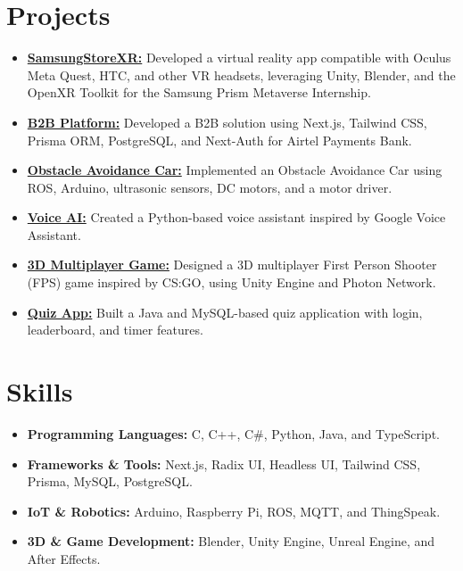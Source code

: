 \documentclass[a4paper,10pt]{article}
\newcommand{\sectionbreak}{\vspace{0.2em}} %
\begin{document}
\sectionbreak

\section{Projects}
\begin{itemize}[noitemsep, topsep=0pt]
    \item \href{https://github.com/Shival-Gupta/SamsungStoreXR}{\textcolor{accentcolor}{\textbf{SamsungStoreXR:}}} Developed a virtual reality app compatible with Oculus Meta Quest, HTC, and other VR headsets, leveraging Unity, Blender, and the OpenXR Toolkit for the Samsung Prism Metaverse Internship.
    \item \href{https://b2b-portal-rho.vercel.app/}{\textcolor{accentcolor}{\textbf{B2B Platform:}}} Developed a B2B solution using Next.js, Tailwind CSS, Prisma ORM, PostgreSQL, and Next-Auth for Airtel Payments Bank.
    \item \href{https://github.com/Shival-Gupta/obstacle-avoidance-car-ros-noetic}{\textcolor{accentcolor}{\textbf{Obstacle Avoidance Car:}}} Implemented an Obstacle Avoidance Car using ROS, Arduino, ultrasonic sensors, DC motors, and a motor driver.
    \item \href{https://github.com/Shival-Gupta/VoiceAI}{\textcolor{accentcolor}{\textbf{Voice AI:}}} Created a Python-based voice assistant inspired by Google Voice Assistant.
    \item \href{https://github.com/Shival-Gupta/WarGame}{\textcolor{accentcolor}{\textbf{3D Multiplayer Game:}}} Designed a 3D multiplayer First Person Shooter (FPS) game inspired by CS:GO, using Unity Engine and Photon Network.
    \item \href{https://github.com/Shival-Gupta/QuizApp}{\textcolor{accentcolor}{\textbf{Quiz App:}}} Built a Java and MySQL-based quiz application with login, leaderboard, and timer features.
\end{itemize}

\sectionbreak

\section{Skills}
\begin{itemize}[noitemsep, topsep=0pt]
    \item \textbf{Programming Languages:} C, C++, C\#, Python, Java, and TypeScript.
    \item \textbf{Frameworks \& Tools:} Next.js, Radix UI, Headless UI, Tailwind CSS, Prisma, MySQL, PostgreSQL.
    \item \textbf{IoT \& Robotics:} Arduino, Raspberry Pi, ROS, MQTT, and ThingSpeak.
    \item \textbf{3D \& Game Development:} Blender, Unity Engine, Unreal Engine, and After Effects.
\end{itemize}
\end{document}

